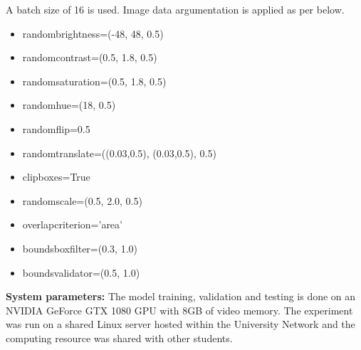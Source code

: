  A batch size of 16 is used. Image data argumentation is applied as per below.
 
\begin{itemize}
	\item random\textunderscore brightness=(-48, 48, 0.5)
	\item random\textunderscore contrast=(0.5, 1.8, 0.5)
	\item random\textunderscore saturation=(0.5, 1.8, 0.5)
	\item random\textunderscore hue=(18, 0.5)
	\item random\textunderscore flip=0.5
	\item random\textunderscore translate=((0.03,0.5), (0.03,0.5), 0.5)
	\item clip\textunderscore boxes=True
	\item random\textunderscore scale=(0.5, 2.0, 0.5)
	\item overlap\textunderscore criterion='area'
	\item bounds\textunderscore box\textunderscore filter=(0.3, 1.0)
	\item bounds\textunderscore validator=(0.5, 1.0)
\end{itemize}

\textbf{System parameters:}
The model training, validation and testing is done on an NVIDIA GeForce GTX 1080 GPU with 8GB of video memory. The experiment was run on a shared Linux server hosted within the University Network and the computing resource was shared with other students.

